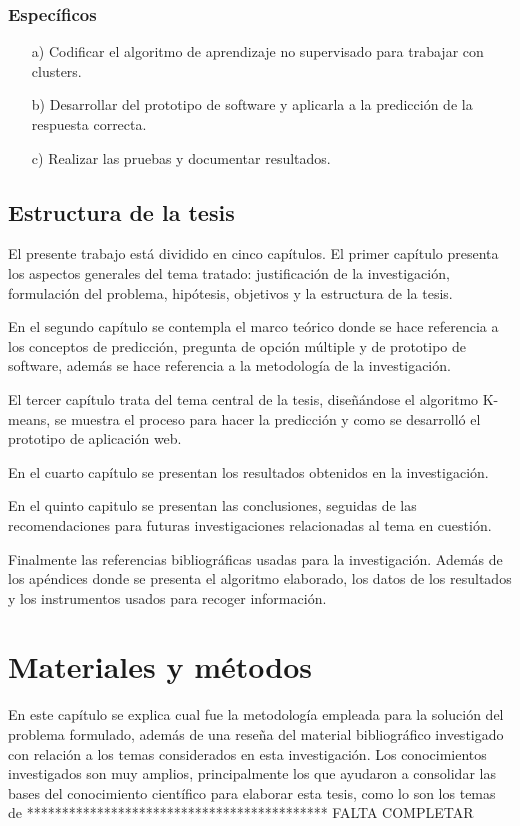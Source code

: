 \subsection{Específicos}
\begin{enumerate}
\item[a)] Codificar el algoritmo de aprendizaje no supervisado para trabajar con clusters.
\item[b)] Desarrollar del prototipo de software y aplicarla a la predicción de la respuesta correcta.
\item[c)] Realizar las pruebas y documentar resultados.
\end{enumerate}
\vskip 0.3cm


\section{Estructura de la tesis}

\vskip 0.1cm
El presente trabajo está dividido en cinco capítulos. El primer capítulo presenta los aspectos generales del tema tratado: justificación de la investigación, formulación del problema, hipótesis, objetivos y la estructura de la tesis.

En el segundo capítulo se contempla el marco teórico donde se hace referencia a los conceptos de predicción, pregunta de opción múltiple y de prototipo de software, además se hace referencia a la metodología de la investigación.

El tercer capítulo trata del tema central de la tesis, diseñándose el algoritmo K-means, se muestra el proceso para hacer la predicción y como se desarrolló el prototipo de aplicación web.

En el cuarto capítulo se presentan los resultados obtenidos en la investigación. 

En el quinto capitulo se presentan las conclusiones, seguidas de las recomendaciones para futuras investigaciones relacionadas al tema en cuestión. 

Finalmente las referencias bibliográficas usadas para la investigación. Además de los apéndices donde se presenta el algoritmo elaborado, los datos de los resultados y los instrumentos usados para recoger información.

\chapter{Materiales y métodos}

En este capítulo se explica cual fue la metodología empleada para la solución del problema formulado, además de una reseña del material bibliográfico investigado con relación a los temas considerados en esta investigación. Los conocimientos investigados son muy amplios, principalmente los que ayudaron a consolidar las bases del conocimiento científico para elaborar esta tesis, como lo son los temas de ******************************************* FALTA COMPLETAR


